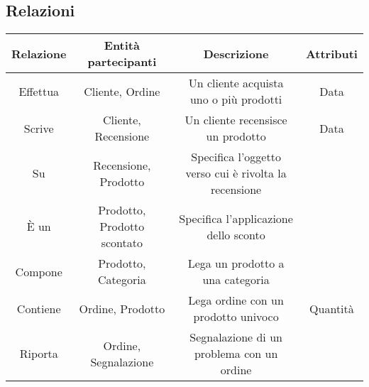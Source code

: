 \subsection{Relazioni}
\begin{center}
\begin{tabular}{ |c|c|c|c|} 
\hline
Relazione & Entità partecipanti & Descrizione & Attributi \\
\hline
\multirow{3}{6em}{Effettua} & \multirow{3}{12em}{Cliente, Ordine} & \multirow{3}{8em}{Un cliente acquista uno o più prodotti} & \multirow{3}{12em}{Data} \\
 &  &  & \\
 &  &  & \\
\hline

\multirow{3}{6em}{Scrive} & \multirow{3}{12em}{Cliente, Recensione} & \multirow{3}{8em}{Un cliente recensisce un prodotto} & \multirow{3}{12em}{Data} \\
 &  &  & \\
 &  &  & \\
\hline

\multirow{3}{6em}{Su} & \multirow{3}{12em}{Recensione, Prodotto} & \multirow{3}{8em}{Specifica l'oggetto verso cui è rivolta la recensione} & \multirow{3}{12em}{} \\
 &  &  & \\
 &  &  & \\
\hline

\multirow{3}{6em}{È un} & \multirow{3}{12em}{Prodotto, Prodotto scontato} & \multirow{3}{8em}{Specifica l'applicazione dello sconto} & \multirow{3}{12em}{} \\
 &  &  & \\
 &  &  & \\
\hline

\multirow{3}{6em}{Compone} & \multirow{3}{12em}{Prodotto, Categoria} & \multirow{3}{8em}{Lega un prodotto a una categoria} & \multirow{3}{12em}{} \\
 &  &  & \\
 &  &  & \\ 
\hline

\multirow{3}{6em}{Contiene} & \multirow{3}{12em}{Ordine, Prodotto} & \multirow{3}{8em}{Lega ordine con un prodotto univoco} & \multirow{3}{12em}{Quantità} \\
 &  &  & \\
 &  &  & \\
\hline

\multirow{3}{6em}{Riporta} & \multirow{3}{12em}{Ordine, Segnalazione} & \multirow{3}{8em}{Segnalazione di un problema con un ordine} & \multirow{3}{12em}{} \\
 &  &  & \\
 &  &  & \\
\hline


\end{tabular}
\end{center}
